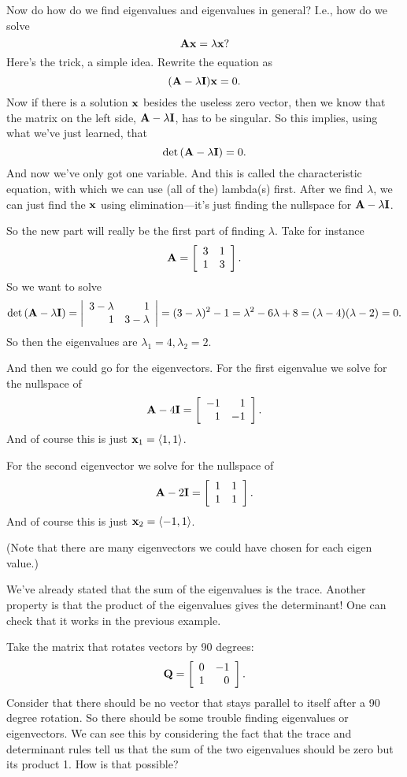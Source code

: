 Now do how do we find eigenvalues and eigenvalues in general? I.e., how do we solve
\[ \boldsymbol{\mathbf{A}} \boldsymbol{\mathbf{x}} = \lambda \boldsymbol{\mathbf{x}}? \]
Here's the trick, a simple idea. Rewrite the equation as
\[ (\boldsymbol{\mathbf{A}} - \lambda \boldsymbol{\mathbf{I}})\boldsymbol{\mathbf{x}} = 0. \]
Now if there is a solution $\boldsymbol{\mathbf{x}}$ besides the useless zero vector, then we know that the matrix on the left side, $\boldsymbol{\mathbf{A}} - \lambda \boldsymbol{\mathbf{I}}$, has to be singular. So this implies, using what we've just learned, that
\[ \mathrm{det}\, (\boldsymbol{\mathbf{A}} - \lambda \boldsymbol{\mathbf{I}}) = 0. \]
And now we've only got one variable. And this is called the characteristic equation, with which we can use (all of the) lambda(s) first. After we find $\lambda$, we can just find the $\boldsymbol{\mathbf{x}}$ using elimination---it's just finding the nullspace for $\boldsymbol{\mathbf{A}} - \lambda \boldsymbol{\mathbf{I}}$. 

So the new part will really be the first part of finding $\lambda$.
\bex
Take for instance
\[ \boldsymbol{\mathbf{A}} = \left[ \begin{array}{rrrrrrrrrrrrrrrrrrrrrrrrr} 3&1\\1&3\\ \end{array} \right]. \]
So we want to solve
\[ \mathrm{det}\, (\boldsymbol{\mathbf{A}} - \lambda \boldsymbol{\mathbf{I}}) = \left| \begin{array}{rrrrrrrrrrrrrrrrrrrrrrrrr} 3-\lambda&1\\1&3-\lambda\\ \end{array} \right| = (3-\lambda)^2 - 1 = \lambda^2 - 6\lambda + 8 = (\lambda - 4)(\lambda - 2) = 0. \]
So then the eigenvalues are $\lambda_1 = 4, \lambda_2 = 2$.

And then we could go for the eigenvectors. For the first eigenvalue we solve for the nullspace of
\[ \boldsymbol{\mathbf{A}} - 4\boldsymbol{\mathbf{I}} = \left[ \begin{array}{rrrrrrrrrrrrrrrrrrrrrrrrr} -1&1\\1&-1\\ \end{array} \right]. \]
And of course this is just $\boldsymbol{\mathbf{x}}_1 = \langle 1,1 \rangle$.

For the second eigenvector we solve for the nullspace of
\[ \boldsymbol{\mathbf{A}} - 2\boldsymbol{\mathbf{I}} = \left[ \begin{array}{rrrrrrrrrrrrrrrrrrrrrrrrr} 1&1\\1&1\\ \end{array} \right]. \]
And of course this is just $\boldsymbol{\mathbf{x}}_2 = \langle -1,1 \rangle$.

(Note that there are many eigenvectors we could have chosen for each eigen value.)
\eex

\brm
We've already stated that the sum of the eigenvalues is the trace. Another property is that the product of the eigenvalues gives the determinant! One can check that it works in the previous example.
\erm 

\bex
Take the matrix that rotates vectors by 90 degrees:
\[ \boldsymbol{\mathbf{Q}} =  \left[ \begin{array}{rrrrrrrrrrrrrrrrrrrrrrrrr} 0&-1\\1&0\\ \end{array} \right]. \]
Consider that there should be no vector that stays parallel to itself after a 90 degree rotation. So there should be some trouble finding eigenvalues or eigenvectors. We can see this by considering the fact that the trace and determinant rules tell us that the sum of the two eigenvalues should be zero but its product 1. How is that possible?

